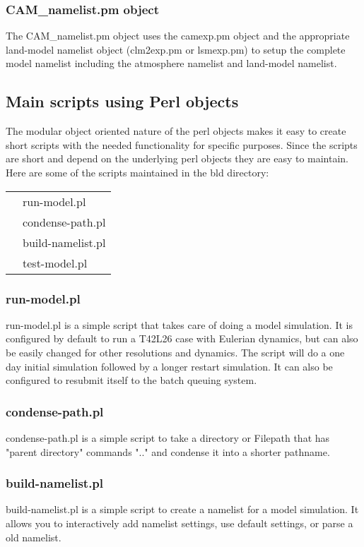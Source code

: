 \documentclass[]{article}
\begin{document}
\subsubsection{CAM\_namelist.pm object}
The CAM\_namelist.pm object uses the camexp.pm object and the appropriate land-model namelist object
(clm2exp.pm or lsmexp.pm) to setup the complete model namelist including the atmosphere namelist
and land-model namelist.
\subsection{Main scripts using Perl objects}
The modular object oriented nature of the perl objects makes it easy to create short scripts
with the needed functionality for specific purposes. Since the scripts are short and depend on
the underlying perl objects they are easy to maintain. Here are some of the scripts maintained
in the bld directory:\\

\begin{tabular}{r p{3.7in}}
      & run-model.pl\\
      & condense-path.pl \\
      & build-namelist.pl \\
      & test-model.pl
\end{tabular}

\subsubsection{run-model.pl}
run-model.pl is a simple script that takes care of doing a model simulation. It is configured by
default to run a T42L26 case with Eulerian dynamics, but can also be easily changed for other
resolutions and dynamics. The script will do a one day initial simulation followed by a longer
restart simulation. It can also be configured to resubmit itself to the batch queuing system.
\subsubsection{condense-path.pl}
condense-path.pl is a simple script to take a directory or Filepath that has "parent directory"
commands ".." and condense it into a shorter pathname.
\subsubsection{build-namelist.pl}
build-namelist.pl is a simple script to create a namelist for a model simulation. It allows you
to interactively add namelist settings, use default settings, or parse a old namelist.
\end{document}
